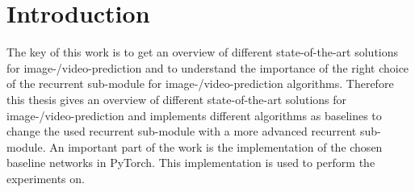 \section{Introduction} \label{section::introduction} 
 The key of this work is to get an overview of different state-of-the-art solutions for image-/video-prediction and to
 understand the importance of the right choice of the recurrent sub-module for image-/video-prediction algorithms. Therefore this thesis
 gives an overview of different state-of-the-art solutions for image-/video-prediction and implements different algorithms as baselines to change the used recurrent
 sub-module with a more advanced recurrent sub-module. 
 An important part of the work is the implementation of the chosen baseline networks in PyTorch.
 This implementation is used to perform the experiments on.